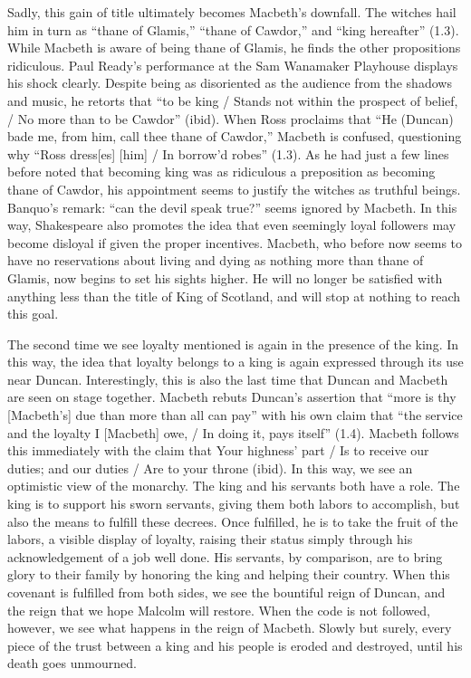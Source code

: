 \documentclass[12pt]{article}[titlepage]
\newcommand{\say}[1]{``#1''}
\newcommand{\1}{\={a}}
\newcommand{\2}{\={e}}
\newcommand{\3}{\={\i}}
\newcommand{\4}{\=o}
\newcommand{\5}{\=u}
\newcommand{\6}{\={A}}
\renewcommand{\,}{\textsuperscript{,}}
\begin{document}
Sadly, this gain of title ultimately becomes Macbeth's downfall.
The witches hail him in turn as \say{thane of Glamis,} \say{thane of Cawdor,} and \say{king hereafter} (1.3).
While Macbeth is aware of being thane of Glamis, he finds the other propositions ridiculous.
Paul Ready's performance at the Sam Wanamaker Playhouse displays his shock clearly.
Despite being as disoriented as the audience from the shadows and music, he retorts that \say{to be king / Stands not within the prospect of belief, / No more than to be Cawdor} (ibid).
When Ross proclaims that \say{He (Duncan) bade me, from him, call thee thane of Cawdor,} Macbeth is confused, questioning why \say{Ross dress[es] [him] / In borrow'd robes} (1.3).
As he had just a few lines before noted that becoming king was as ridiculous a preposition as becoming thane of Cawdor, his appointment seems to justify the witches as truthful beings.
Banquo's remark: \say{can the devil speak true?} seems ignored by Macbeth.
In this way, Shakespeare also promotes the idea that even seemingly loyal followers may become disloyal if given the proper incentives.
Macbeth, who before now seems to have no reservations about living and dying as nothing more than thane of Glamis, now begins to set his sights higher.
He will no longer be satisfied with anything less than the title of King of Scotland, and will stop at nothing to reach this goal.

The second time we see loyalty mentioned is again in the presence of the king.
In this way, the idea that loyalty belongs to a king is again expressed through its use near Duncan.
Interestingly, this is also the last time that Duncan and Macbeth are seen on stage together.
Macbeth rebuts Duncan's assertion that \say{more is thy [Macbeth's] due than more than all can pay} with his own claim that \say{the service and the loyalty I [Macbeth] owe, / In doing it, pays itself} (1.4).
Macbeth follows this immediately with the claim that {Your highness' part / Is to receive our duties; and our duties / Are to your throne} (ibid).
In this way, we see an optimistic view of the monarchy.
The king and his servants both have a role.
The king is to support his sworn servants, giving them both labors to accomplish, but also the means to fulfill these decrees.
Once fulfilled, he is to take the fruit of the labors, a visible display of loyalty, raising their status simply through his acknowledgement of a job well done.
His servants, by comparison, are to bring glory to their family by honoring the king and helping their country.
When this covenant is fulfilled from both sides, we see the bountiful reign of Duncan, and the reign that we hope Malcolm will restore.
When the code is not followed, however, we see what happens in the reign of Macbeth.
Slowly but surely, every piece of the trust between a king and his people is eroded and destroyed, until his death goes unmourned.
\end{document}
